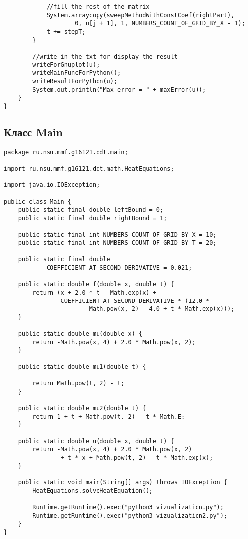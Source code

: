\begin{verbatim}
            //fill the rest of the matrix
            System.arraycopy(sweepMethodWithConstCoef(rightPart),
                    0, u[j + 1], 1, NUMBERS_COUNT_OF_GRID_BY_X - 1);
            t += stepT;
        }

        //write in the txt for display the result
        writeForGnuplot(u);
        writeMainFuncForPython();
        writeResultForPython(u);
        System.out.println("Max error = " + maxError(u));
    }
}
\end{verbatim}
\subsection{Класс  Main}
\begin{verbatim}
package ru.nsu.mmf.g16121.ddt.main;

import ru.nsu.mmf.g16121.ddt.math.HeatEquations;

import java.io.IOException;

public class Main {
    public static final double leftBound = 0;
    public static final double rightBound = 1;

    public static final int NUMBERS_COUNT_OF_GRID_BY_X = 10;
    public static final int NUMBERS_COUNT_OF_GRID_BY_T = 20;

    public static final double 
            COEFFICIENT_AT_SECOND_DERIVATIVE = 0.021;

    public static double f(double x, double t) {
        return (x + 2.0 * t - Math.exp(x) + 
                COEFFICIENT_AT_SECOND_DERIVATIVE * (12.0 * 
                        Math.pow(x, 2) - 4.0 + t * Math.exp(x)));
    }

    public static double mu(double x) {
        return -Math.pow(x, 4) + 2.0 * Math.pow(x, 2);
    }

    public static double mu1(double t) {
        
        return Math.pow(t, 2) - t;
    }

    public static double mu2(double t) {
        return 1 + t + Math.pow(t, 2) - t * Math.E;
    }

    public static double u(double x, double t) {
        return -Math.pow(x, 4) + 2.0 * Math.pow(x, 2) 
                + t * x + Math.pow(t, 2) - t * Math.exp(x);
    }

    public static void main(String[] args) throws IOException {
        HeatEquations.solveHeatEquation();

        Runtime.getRuntime().exec("python3 vizualization.py");
        Runtime.getRuntime().exec("python3 vizualization2.py");
    }
}

\end{verbatim}